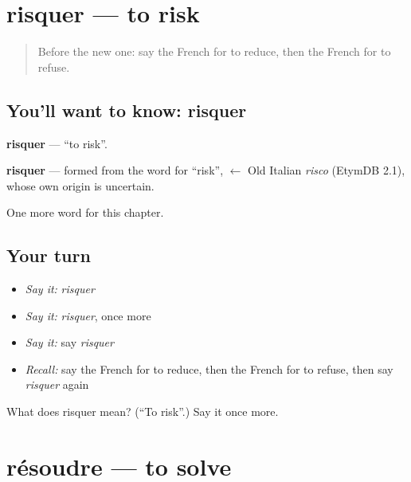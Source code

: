 \section[risquer]{risquer — to risk}

\label{lesson:FR-C238-risquer}



\begin{quote}
Before the new one: say the French for to reduce, then the French for to refuse.
\end{quote}

\subsection*{You'll want to know: risquer}
\textbf{risquer} — \textquotedblleft{}to risk\textquotedblright{}.

\begin{cousinweb}
\textbf{risquer} — formed from the word for \textquotedblleft{}risk\textquotedblright{}, $\leftarrow$ Old Italian \emph{risco} (EtymDB 2.1), whose own origin is uncertain.
\end{cousinweb}

\begin{grammarlens}[title={What you've built}]
One more word for this chapter.
\end{grammarlens}

\subsection*{Your turn}
\begin{itemize}
\raggedright
  \item \emph{Say it:} \emph{risquer}
  \item \emph{Say it:} \emph{risquer}, once more
  \item \emph{Say it:} say \emph{risquer}
  \item \emph{Recall:} say the French for to reduce, then the French for to refuse, then say \emph{risquer} again
\end{itemize}

\begin{tcolorbox}[breakable,colback=teal!4,colframe=teal!35!black,title={Before you move on}]
What does risquer mean? (\textquotedblleft{}To risk\textquotedblright{}.) Say it once more.
\end{tcolorbox}
\section[résoudre]{résoudre — to solve}

